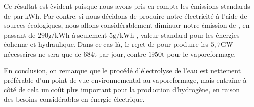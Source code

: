 \documentclass[a4paper, oneside, 12pt]{article}
\begin{document}
Ce résultat est évident puisque nous avons pris en compte 
les émissions standards de  par kWh.
Par contre, si nous décidons de produire notre électricité à l'aide de sources écologiques,
nous allons considérablement diminuer notre émission de , 
en passant de $290\si{\gram/\kilo\watt\hour}$ à seulement $5\si{\gram/\kilo\watt\hour}$ 
\cite{energie}, 
valeur standard pour les énergies éolienne et hydraulique. 
Dans ce cas-là, le rejet de  pour produire les $5,7\si{\giga\watt}$ nécessaires 
ne sera que de $684\si{\tonne}$ par jour, 
contre $1950\si{\tonne}$ pour le vaporeformage. 
\newline

En conclusion, on remarque que le procédé d'électrolyse de l'eau 
est nettement préférable d'un point de vue environnemental au vaporeformage, 
mais entraîne à côté de cela un coût plus important pour la production d'hydrogène,
en raison des besoins considérables en énergie électrique.

\printbibliography
\end{document}
